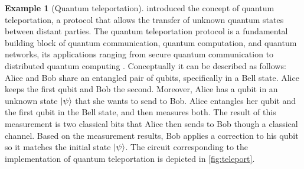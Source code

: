 \documentclass[10pt,a4paper]{amsart}
\theoremstyle{definition}
\theoremstyle{definition}
\newtheorem{example}[definition]{Example}
\theoremstyle{definition}
\theoremstyle{definition}
\theoremstyle{definition}
\theoremstyle{definition}
\begin{document}
\begin{example}[Quantum teleportation] \label{ex:quantum_teleportation_syntax}
\cite{bennett1993teleporting} introduced the concept of quantum teleportation,
a protocol that allows the transfer of  unknown quantum states between distant
parties.  The quantum teleportation protocol is a fundamental building block of
quantum communication, quantum computation, and quantum networks, its
applications ranging from secure quantum communication to distributed quantum
computing
\cite{briegel1998quantum,gottesman1999demonstrating,kimble2008quantum}.
Conceptually it can be described as follows: Alice and Bob share an entangled
pair of qubits, specifically in a Bell state. Alice keeps the first qubit and
Bob the second. Moreover, Alice has a qubit in an unknown state $\ket{\psi}$
that she wants to send to Bob.  Alice entangles her qubit and the first qubit
in the Bell state, and then measures both. The result of this measurement is
two classical bits that Alice then sends to Bob though a classical channel.
Based on the measurement results, Bob applies a correction to his qubit so it
matches the initial state $\ket{\psi}$.  The circuit corresponding to the
implementation of quantum teleportation is depicted in \autoref{fig:teleport}.



\end{example}
\end{document}
